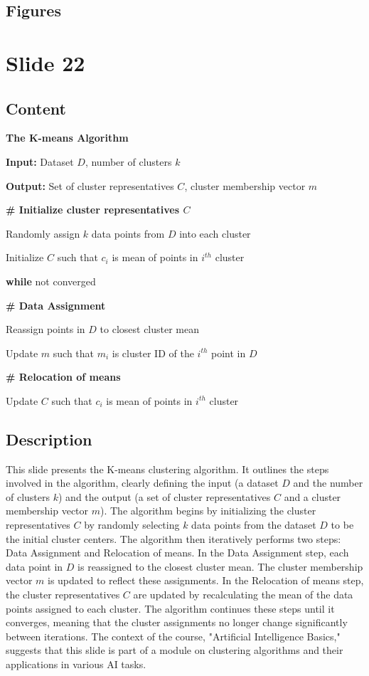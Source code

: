 \documentclass{article}%
\begin{document}
\subsection{Figures}%
\begin{figure}[H]%
\centering%
\end{figure}

%
\newpage%
\section{Slide 22}%
\label{sec:Slide22}%
\subsection{Content}%

\textbf{The K-means Algorithm}

\textbf{Input:} Dataset $D$, number of clusters $k$

\textbf{Output:} Set of cluster representatives $C$, cluster membership vector $m$

\textbf{\# Initialize cluster representatives $C$}

Randomly assign $k$ data points from $D$ into each cluster

Initialize $C$ such that $c_i$ is mean of points in $i^{th}$ cluster

\textbf{while} not converged

\textbf{\# Data Assignment}

Reassign points in $D$ to closest cluster mean

Update $m$ such that $m_i$ is cluster ID of the $i^{th}$ point in $D$

\textbf{\# Relocation of means}

Update $C$ such that $c_i$ is mean of points in $i^{th}$ cluster
%
\subsection{Description}%
This slide presents the K-means clustering algorithm.  It outlines the steps involved in the algorithm, clearly defining the input (a dataset $D$ and the number of clusters $k$) and the output (a set of cluster representatives $C$ and a cluster membership vector $m$).  The algorithm begins by initializing the cluster representatives $C$ by randomly selecting $k$ data points from the dataset $D$ to be the initial cluster centers.  The algorithm then iteratively performs two steps:  Data Assignment and Relocation of means.  In the Data Assignment step, each data point in $D$ is reassigned to the closest cluster mean.  The cluster membership vector $m$ is updated to reflect these assignments.  In the Relocation of means step, the cluster representatives $C$ are updated by recalculating the mean of the data points assigned to each cluster.  The algorithm continues these steps until it converges, meaning that the cluster assignments no longer change significantly between iterations.  The context of the course, "Artificial Intelligence Basics," suggests that this slide is part of a module on clustering algorithms and their applications in various AI tasks.%
\end{document}
